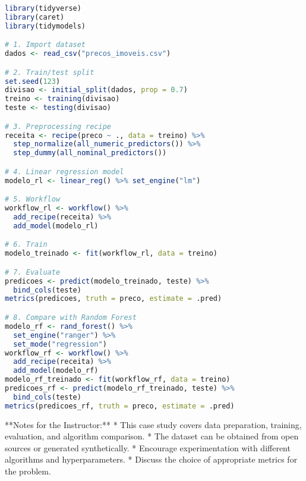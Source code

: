 \begin{lstlisting}[language=R]
library(tidyverse)
library(caret)
library(tidymodels)

# 1. Import dataset
dados <- read_csv("precos_imoveis.csv")

# 2. Train/test split
set.seed(123)
divisao <- initial_split(dados, prop = 0.7)
treino <- training(divisao)
teste <- testing(divisao)

# 3. Preprocessing recipe
receita <- recipe(preco ~ ., data = treino) %>%
  step_normalize(all_numeric_predictors()) %>%
  step_dummy(all_nominal_predictors())

# 4. Linear regression model
modelo_rl <- linear_reg() %>% set_engine("lm")

# 5. Workflow
workflow_rl <- workflow() %>%
  add_recipe(receita) %>%
  add_model(modelo_rl)

# 6. Train
modelo_treinado <- fit(workflow_rl, data = treino)

# 7. Evaluate
predicoes <- predict(modelo_treinado, teste) %>%
  bind_cols(teste)
metrics(predicoes, truth = preco, estimate = .pred)

# 8. Compare with Random Forest
modelo_rf <- rand_forest() %>%
  set_engine("ranger") %>%
  set_mode("regression")
workflow_rf <- workflow() %>%
  add_recipe(receita) %>%
  add_model(modelo_rf)
modelo_rf_treinado <- fit(workflow_rf, data = treino)
predicoes_rf <- predict(modelo_rf_treinado, teste) %>%
  bind_cols(teste)
metrics(predicoes_rf, truth = preco, estimate = .pred)
\end{lstlisting}

**Notes for the Instructor:**
* This case study covers data preparation, training, evaluation, and algorithm comparison.
* The dataset can be obtained from open sources or generated synthetically.
* Encourage experimentation with different algorithms and hyperparameters.
* Discuss the choice of appropriate metrics for the problem.